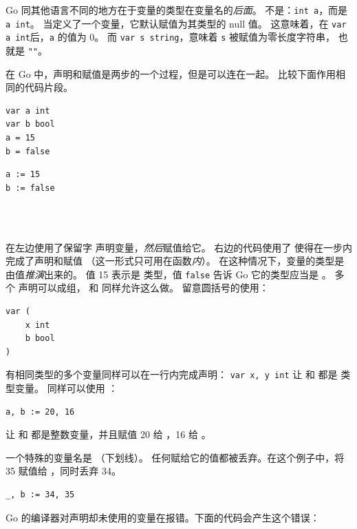 Go 同其他语言不同的地方在于变量的类型在变量名的\emph{后面}。
不是：\lstinline{int a}，而是 \lstinline{a int}。
当定义了一个变量，它默认赋值为其类型的 null 值。
这意味着，在 \lstinline{var a int}后，\lstinline{a} 的值为 0。
而 \lstinline{var s string}，意味着 \lstinline{s} 被赋值为零长度字符串，
也就是 \lstinline{""}。

在 Go 中，声明和赋值是两步的一个过程，但是可以连在一起。
比较下面作用相同的代码片段。

\begin{minipage}{.5\textwidth}
\begin{lstlisting}[linewidth=.5\textwidth,caption={Declaration with =}]
var a int
var b bool
a = 15
b = false
\end{lstlisting}
\hfill
\end{minipage}
\begin{minipage}{.5\textwidth}
\begin{lstlisting}[linewidth=.5\textwidth,caption={Declaration with :=}]
a := 15
b := false
\end{lstlisting}
\ \\
\ \\
\hfill
\end{minipage}

在左边使用了保留字  声明变量，\emph{然后}赋值给它。
右边的代码使用了 \mbox{\key{:=}{ }} 使得在一步内完成了声明和赋值
（这一形式只可用在函数\emph{内}）。
在这种情况下，变量的类型是由值\emph{推演}出来的。
值 15 表示是  类型，值 \texttt{false} 告诉 Go 它的类型应当是 。
多个  声明可以成组， 和  同样允许这么做。
留意圆括号的使用：
\begin{lstlisting}
var (
    x int
    b bool
)
\end{lstlisting}

有相同类型的多个变量同样可以在一行内完成声明：
\lstinline{var x, y int} 让  和  都是  类型变量。
同样可以使用 ：
\begin{lstlisting}
a, b := 20, 16
\end{lstlisting}
让  和  都是整数变量，并且赋值 20 给 ，16 给 。

一个特殊的变量名是 \var{\textbf{\_}} （下划线）。
任何赋给它的值都被丢弃。在这个例子中，将 35 赋值给 ，同时丢弃 34。
\begin{lstlisting}
_, b := 34, 35
\end{lstlisting}
Go 的编译器对声明却未使用的变量在报错。下面的代码会产生这个错误：


